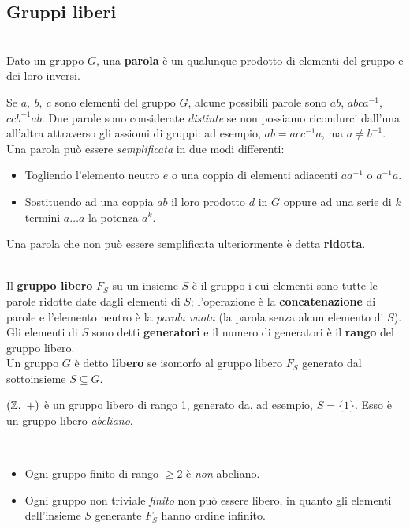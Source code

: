 \subsection{Gruppi liberi}\label{gruppolibero}
\begin{define}[Parola.]~{}\\
	Dato un gruppo $G$, una \textbf{parola} è un qualunque prodotto di elementi del gruppo e dei loro inversi.
\end{define}
Se $a,\ b,\ c$ sono elementi del gruppo $G$, alcune possibili parole sono $ab$, $abca^{-1}$, $ccb^{-1}ab$.  Due parole sono considerate \textit{distinte} se non possiamo ricondurci dall'una all'altra attraverso gli assiomi di gruppi: ad esempio, $ab=acc^{-1}a$, ma $a\neq b^{-1}$. Una parola può essere \textit{semplificata} in due modi differenti:
\begin{itemize}
	\item Togliendo l'elemento neutro $e$ o una coppia di elementi adiacenti $aa^{-1}$ o $a^{-1}a$.
	\item Sostituendo ad una coppia $ab$ il loro prodotto $d$ in $G$ oppure ad una serie di $k$ termini $a\ldots a$ la potenza $a^k$.
\end{itemize}
Una parola che non può essere semplificata ulteriormente è detta \textbf{ridotta}.
\begin{define}~{}\\
Il \textbf{gruppo libero} $F_S$ su un insieme $S$ è il gruppo i cui elementi sono tutte le parole ridotte date dagli elementi di $S$; l'operazione è la \textbf{concatenazione} di parole e l'elemento neutro è la \textit{parola vuota} (la parola senza alcun elemento di $S$).\\
Gli elementi di $S$ sono detti \textbf{generatori} e il numero di generatori è il \textbf{rango} del gruppo libero.\\
Un gruppo $G$ è detto \textbf{libero} se isomorfo al gruppo libero $F_S$ generato dal sottoinsieme $S\subseteq G$.
\end{define}
\begin{example}
	$\left(\mathbb{Z},\ +\right)$ è un gruppo libero di rango 1, generato da, ad esempio, $S=\{1\}$. Esso è un gruppo libero \textit{abeliano}.
\end{example}
\begin{observes}~{}
	\begin{itemize}
		\item Ogni gruppo finito di rango $\geq 2$ è \textit{non} abeliano.
		\item Ogni gruppo non triviale \textit{finito} non può essere libero, in quanto gli elementi dell'insieme $S$ generante $F_S$ hanno ordine infinito. 
	\end{itemize}
\vspace{-3mm}
\end{observes}
